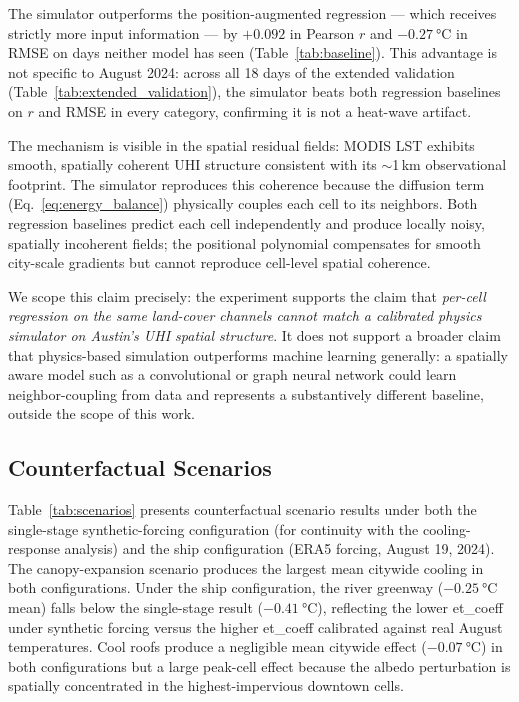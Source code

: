 \documentclass[12pt, letterpaper]{article}
\begin{document}
The simulator outperforms the position-augmented regression — which receives
strictly more input information — by $+0.092$ in Pearson $r$ and
$\SI{-0.27}{\degreeCelsius}$ in RMSE on days neither model has seen
(Table~\ref{tab:baseline}). This advantage is not specific to August 2024:
across all 18 days of the extended validation
(Table~\ref{tab:extended_validation}), the simulator beats both regression
baselines on $r$ and RMSE in every category, confirming it is not a
heat-wave artifact.

The mechanism is visible in the spatial residual fields: MODIS LST exhibits
smooth, spatially coherent UHI structure consistent with its $\sim$1\,km
observational footprint. The simulator reproduces this coherence because the
diffusion term (Eq.~\ref{eq:energy_balance}) physically couples each cell
to its neighbors. Both regression baselines predict each cell independently
and produce locally noisy, spatially incoherent fields; the positional
polynomial compensates for smooth city-scale gradients but cannot reproduce
cell-level spatial coherence.

We scope this claim precisely: the experiment supports the claim that
\emph{per-cell regression on the same land-cover channels cannot match a
calibrated physics simulator on Austin's UHI spatial structure}. It does
not support a broader claim that physics-based simulation outperforms
machine learning generally: a spatially aware model such as a convolutional
or graph neural network could learn neighbor-coupling from data and represents
a substantively different baseline, outside the scope of this work.

\subsection{Counterfactual Scenarios}

Table~\ref{tab:scenarios} presents counterfactual scenario results under
both the single-stage synthetic-forcing configuration (for continuity with
the cooling-response analysis) and the ship configuration (ERA5 forcing,
August 19, 2024). The canopy-expansion scenario produces the largest mean
citywide cooling in both configurations. Under the ship configuration,
the river greenway ($\SI{-0.25}{\degreeCelsius}$ mean) falls below the
single-stage result ($\SI{-0.41}{\degreeCelsius}$), reflecting the
lower et\_coeff under synthetic forcing versus the higher et\_coeff
calibrated against real August temperatures. Cool roofs produce a negligible
mean citywide effect ($\SI{-0.07}{\degreeCelsius}$) in both configurations
but a large peak-cell effect because the albedo perturbation is spatially
concentrated in the highest-impervious downtown cells.
\end{document}
